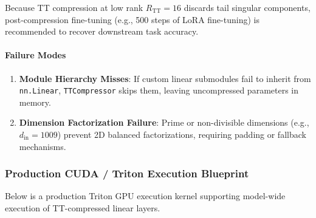 Because TT compression at low rank $R_{\text{TT}} = 16$ discards tail singular components, post-compression fine-tuning (e.g., 500 steps of LoRA fine-tuning) is recommended to recover downstream task accuracy.

\paragraph{Failure Modes}
\begin{enumerate}
\item \textbf{Module Hierarchy Misses}: If custom linear submodules fail to inherit from \texttt{nn.Linear}, \texttt{TTCompressor} skips them, leaving uncompressed parameters in memory.
\item \textbf{Dimension Factorization Failure}: Prime or non-divisible dimensions (e.g., $d_{\text{in}} = 1009$) prevent 2D balanced factorizations, requiring padding or fallback mechanisms.


\end{enumerate}
\subsubsection*{Production CUDA / Triton Execution Blueprint}

Below is a production Triton GPU execution kernel supporting model-wide execution of TT-compressed linear layers.

